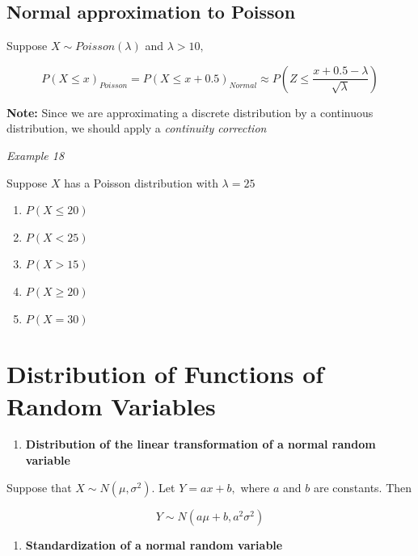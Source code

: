 \documentclass[]{book}
\providecommand{\tightlist}{%
  \setlength{\itemsep}{0pt}\setlength{\parskip}{0pt}}
\begin{document}
\hypertarget{normal-approximation-to-poisson}{%
\subsection{Normal approximation to Poisson}\label{normal-approximation-to-poisson}}

Suppose \(X\sim Poisson(\lambda)\) and \(\lambda > 10,\)

\[P(X \leq x)_{Poisson} = P(X \leq x + 0.5)_{Normal} \approx P(Z \leq \frac{x+0.5-\lambda}{\sqrt{\lambda}})\]

\textbf{Note:} Since we are approximating a discrete distribution by a continuous distribution, we should apply a \emph{continuity correction}

\emph{Example 18}

Suppose \(X\) has a Poisson distribution with \(\lambda=25\)

\begin{enumerate}
\def\labelenumi{\arabic{enumi}.}
\tightlist
\item
  \(P(X\leq 20)\)
\item
  \(P(X < 25)\)
\item
  \(P(X > 15)\)
\item
  \(P(X \geq 20)\)
\item
  \(P(X = 30)\)
\end{enumerate}

\hypertarget{distribution-of-functions-of-random-variables}{%
\section{Distribution of Functions of Random Variables}\label{distribution-of-functions-of-random-variables}}

\begin{enumerate}
\def\labelenumi{\arabic{enumi}.}
\tightlist
\item
  \textbf{Distribution of the linear transformation of a normal random variable}
\end{enumerate}

Suppose that \(X \sim N(\mu, \sigma^2).\) Let \(Y= ax+b,\) where \(a\) and \(b\) are constants. Then

\[Y\sim N(a\mu +b, a^2\sigma^2)\]

\begin{enumerate}
\def\labelenumi{\arabic{enumi}.}
\setcounter{enumi}{1}
\tightlist
\item
  \textbf{Standardization of a normal random variable}
\end{enumerate}
\end{document}
